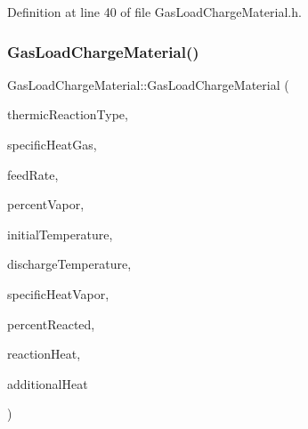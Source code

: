 Definition at line 40 of file Gas\+Load\+Charge\+Material.\+h.

\mbox{\label{class_gas_load_charge_material_a4ad94a94d25bad9eaeca4947d879f35f}} 
\subsubsection{\texorpdfstring{Gas\+Load\+Charge\+Material()}{GasLoadChargeMaterial()}\hspace{0.1cm}{\footnotesize\ttfamily [2/3]}}
{\footnotesize\ttfamily Gas\+Load\+Charge\+Material\+::\+Gas\+Load\+Charge\+Material (\begin{DoxyParamCaption}\item[{const \hyperlink{namespace_load_charge_material_a51d4263e865a5d86236622dd3fe23fd1}{Load\+Charge\+Material\+::\+Thermic\+Reaction\+Type}}]{thermic\+Reaction\+Type,  }\item[{const double}]{specific\+Heat\+Gas,  }\item[{const double}]{feed\+Rate,  }\item[{const double}]{percent\+Vapor,  }\item[{const double}]{initial\+Temperature,  }\item[{const double}]{discharge\+Temperature,  }\item[{const double}]{specific\+Heat\+Vapor,  }\item[{const double}]{percent\+Reacted,  }\item[{const double}]{reaction\+Heat,  }\item[{const double}]{additional\+Heat }\end{DoxyParamCaption})\hspace{0.3cm}{\ttfamily [inline]}}

